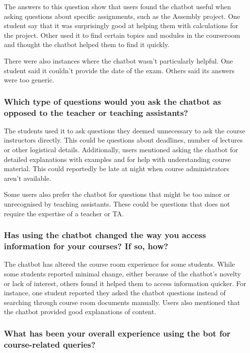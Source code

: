 The answers to this question show that users found the chatbot useful when asking questions about specific assignments, such as the Assembly project. One student say that it was surprisingly good at helping them with calculations for the project. Other used it to find certain topics and modules in the courseroom and thought the chatbot helped them to find it quickly.


There were also instances where the chatbot wasn’t particularly helpful. One student said it couldn’t provide the date of the exam. Others said its answers were too generic.


\subsubsection{Which type of questions would you ask the chatbot as opposed to the teacher or teaching assistants?}


The students used it to ask questions they deemed unnecessary to ask the course instructors directly. This could be questions about deadlines, number of lectures or other logistical details. Additionally, users mentioned asking the chatbot for detailed explanations with examples and for help with understanding course material. This could reportedly be late at night when course administrators aren’t available.


Some users also prefer the chatbot for questions that might be too minor or unrecognised by teaching assistants. These could be questions that does not require the expertise of a teacher or TA.


\subsubsection{Has using the chatbot changed the way you access information for your courses? If so, how?}


The chatbot has altered the course room experience for some students. While some students reported minimal change, either because of the chatbot's novelty or lack of interest, others found it helped them to access information quicker. For instance, one student reported they asked the chatbot questions instead of searching through course room documents manually. Users also mentioned that the chatbot provided good explanations of content.


\subsubsection{What has been your overall experience using the bot for course-related queries?}


